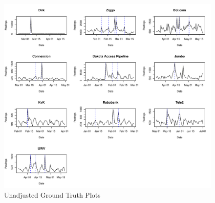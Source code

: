 \documentclass[../main.tex]{subfiles}
\begin{document}
\begin{figure}[h]
    \includegraphics[width=\textwidth]{figures/GroundTruthAnnotations}
    \caption{Unadjusted Ground Truth Plots}
    \label{fig:truth1}
\end{figure}
\end{document}

